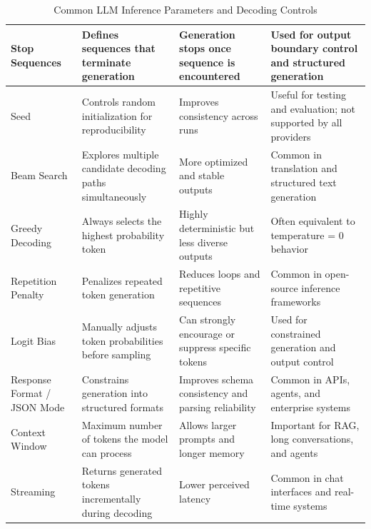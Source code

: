 \documentclass[10pt,a4paper]{article}
\begin{document}
\begin{table}[H]
\begin{tabular}{|p{3cm}|p{4.5cm}|p{3.5cm}|p{4cm}|}
Stop Sequences &
Defines sequences that terminate generation &
Generation stops once sequence is encountered &
Used for output boundary control and structured generation \\

\hline

Seed &
Controls random initialization for reproducibility &
Improves consistency across runs &
Useful for testing and evaluation; not supported by all providers \\

\hline

Beam Search &
Explores multiple candidate decoding paths simultaneously &
More optimized and stable outputs &
Common in translation and structured text generation \\

\hline

Greedy Decoding &
Always selects the highest probability token &
Highly deterministic but less diverse outputs &
Often equivalent to temperature = 0 behavior \\

\hline

Repetition Penalty &
Penalizes repeated token generation &
Reduces loops and repetitive sequences &
Common in open-source inference frameworks \\

\hline

Logit Bias &
Manually adjusts token probabilities before sampling &
Can strongly encourage or suppress specific tokens &
Used for constrained generation and output control \\

\hline

Response Format / JSON Mode &
Constrains generation into structured formats &
Improves schema consistency and parsing reliability &
Common in APIs, agents, and enterprise systems \\

\hline

Context Window &
Maximum number of tokens the model can process &
Allows larger prompts and longer memory &
Important for RAG, long conversations, and agents \\

\hline

Streaming &
Returns generated tokens incrementally during decoding &
Lower perceived latency &
Common in chat interfaces and real-time systems \\

\hline

\end{tabular}

\caption{Common LLM Inference Parameters and Decoding Controls}
\label{tab:llm-inference-parameters}

\end{table}
\end{document}
